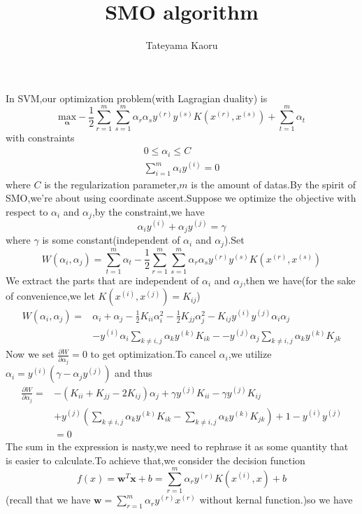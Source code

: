 \documentclass{article}
\begin{document}
\title{SMO algorithm}
\author{Tateyama Kaoru}
\maketitle
In SVM,our optimization problem(with Lagragian duality) is$$\underset{\bm{\alpha}}{\text{max}}-\frac{1}{2}\sum_{r=1}^{m}\sum_{s=1}^{m}\alpha_r\alpha_sy^{(r)} y^{(s)} K(x^{(r)},x^{(s)})+\sum_{t=1}^{m}\alpha_t$$with constraints
\begin{align*}
	0\le\alpha_i\le C\\
	\sum_{i=1}^{m}\alpha_i y^{(i)}=0
\end{align*}
where $C$ is the regularization parameter,$m$ is the amount of datas.By the spirit of SMO,we're about using coordinate ascent.Suppose we optimize the objective with respect to $\alpha_i$ and $\alpha_j$,by the constraint,we have$$\alpha_i y^{(i)}+\alpha_j y^{(j)}=\gamma$$where $\gamma$ is some constant(independent of $\alpha_i$ and $\alpha_j$).Set$$W(\alpha_i,\alpha_j)=\sum_{t=1}^{m}\alpha_t-\frac{1}{2}\sum_{r=1}^{m}\sum_{s=1}^{m}\alpha_r\alpha_sy^{(r)} y^{(s)} K(x^{(r)},x^{(s)})$$
We extract the parts that are independent of $\alpha_i$ and $\alpha_j$,then we have(for the sake of convenience,we let $K(x^{(i)},x^{(j)})=K_{ij}$)
\begin{align*}
	W(\alpha_i,\alpha_j)=&\alpha_i+\alpha_j-\frac{1}{2}K_{ii}\alpha_{i}^{2}-\frac{1}{2}K_{jj}\alpha_j^2-K_{ij}y^{(i)}y^{(j)}\alpha_i\alpha_j\\&-y^{(i)}\alpha_i\underset{k\ne i,j}{\sum}\alpha_k y^{(k)}K_{ik}--y^{(j)}\alpha_j\underset{k\ne i,j}{\sum}\alpha_k y^{(k)}K_{jk}
\end{align*}
Now we set $\frac{\partial W}{\partial \alpha_j}=0$ to get optimization.To cancel $\alpha_i$,we utilize $\alpha_i=y^{(i)}(\gamma-\alpha_j y^{(j)})$ and thus
\begin{align*}
	\frac{\partial W}{\partial \alpha_j}=&-(K_{ii}+K_{jj}-2K_{ij})\alpha_j+\gamma y^{(j)}K_{ii}-\gamma y^{(j)}K_{ij}\\&+y^{(j)}(\underset{k\ne i,j}{\sum}\alpha_k y^{(k)}K_{ik}-\underset{k\ne i,j}{\sum}\alpha_k y^{(k)}K_{jk})+1-y^{(i)}y^{(j)}\\&=0
\end{align*}
The sum in the expression is nasty,we need to rephrase it as some quantity that is easier to calculate.To achieve that,we consider the decision function$$f(x)=\bm{w}^{T}\bm{x}+b=\sum_{r=1}^{m}\alpha_r y^{(r)}K(x^{(i)},x)+b$$
(recall that we have $\bm{w}=\sum_{r=1}^{m}\alpha_ry^{(r)}x^{(r)}$ without kernal function.)so we have
\end{document}
